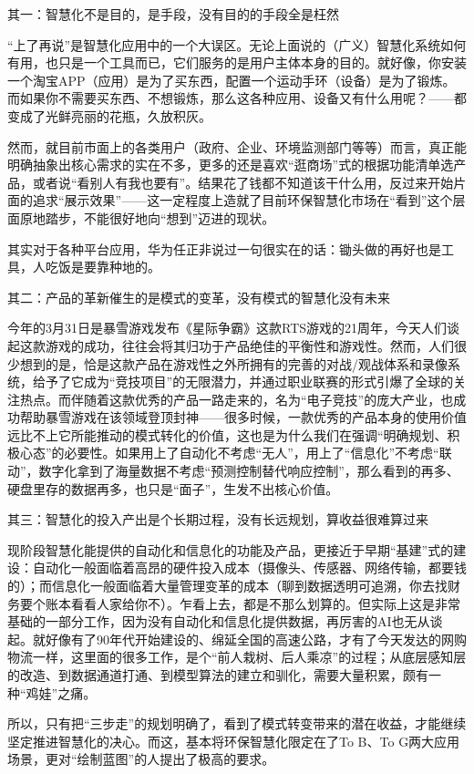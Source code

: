 \documentclass[
]{book}
\begin{document}
其一：智慧化不是目的，是手段，没有目的的手段全是枉然

``上了再说''是智慧化应用中的一个大误区。无论上面说的（广义）智慧化系统如何有用，也只是一个工具而已，它们服务的是用户主体本身的目的。就好像，你安装一个淘宝APP（应用）是为了买东西，配置一个运动手环（设备）是为了锻炼。而如果你不需要买东西、不想锻炼，那么这各种应用、设备又有什么用呢？------都变成了光鲜亮丽的花瓶，久放积灰。

然而，就目前市面上的各类用户（政府、企业、环境监测部门等等）而言，真正能明确抽象出核心需求的实在不多，更多的还是喜欢``逛商场''式的根据功能清单选产品，或者说``看别人有我也要有''。结果花了钱都不知道该干什么用，反过来开始片面的追求``展示效果''------这一定程度上造就了目前环保智慧化市场在``看到''这个层面原地踏步，不能很好地向``想到''迈进的现状。

其实对于各种平台应用，华为任正非说过一句很实在的话：锄头做的再好也是工具，人吃饭是要靠种地的。

其二：产品的革新催生的是模式的变革，没有模式的智慧化没有未来

今年的3月31日是暴雪游戏发布《星际争霸》这款RTS游戏的21周年，今天人们谈起这款游戏的成功，往往会将其归功于产品绝佳的平衡性和游戏性。然而，人们很少想到的是，恰是这款产品在游戏性之外所拥有的完善的对战/观战体系和录像系统，给予了它成为``竞技项目''的无限潜力，并通过职业联赛的形式引爆了全球的关注热点。而伴随着这款优秀的产品一路走来的，名为``电子竞技''的庞大产业，也成功帮助暴雪游戏在该领域登顶封神------很多时候，一款优秀的产品本身的使用价值远比不上它所能推动的模式转化的价值，这也是为什么我们在强调``明确规划、积极心态''的必要性。如果用上了自动化不考虑``无人''，用上了``信息化''不考虑``联动''，数字化拿到了海量数据不考虑``预测控制替代响应控制''，那么看到的再多、硬盘里存的数据再多，也只是``面子''，生发不出核心价值。

其三：智慧化的投入产出是个长期过程，没有长远规划，算收益很难算过来

现阶段智慧化能提供的自动化和信息化的功能及产品，更接近于早期``基建''式的建设：自动化一般面临着高昂的硬件投入成本（摄像头、传感器、网络传输，都要钱的）；而信息化一般面临着大量管理变革的成本（聊到数据透明可追溯，你去找财务要个账本看看人家给你不）。乍看上去，都是不那么划算的。但实际上这是非常基础的一部分工作，因为没有自动化和信息化提供数据，再厉害的AI也无从谈起。就好像有了90年代开始建设的、绵延全国的高速公路，才有了今天发达的网购物流一样，这里面的很多工作，是个``前人栽树、后人乘凉''的过程；从底层感知层的改造、到数据通道打通、到模型算法的建立和驯化，需要大量积累，颇有一种``鸡娃''之痛。

所以，只有把``三步走''的规划明确了，看到了模式转变带来的潜在收益，才能继续坚定推进智慧化的决心。而这，基本将环保智慧化限定在了To B、To G两大应用场景，更对``绘制蓝图''的人提出了极高的要求。
\end{document}
